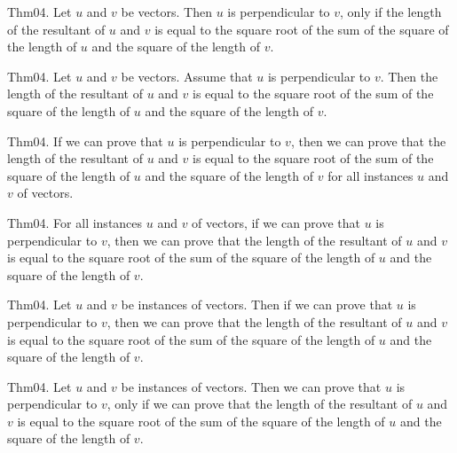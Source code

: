 \documentclass{article}
\begin{document}
Thm04. Let $u$ and $v$ be vectors. Then $u$ is perpendicular to $v$, only if the length of the resultant of $u$ and $v$ is equal to the square root of the sum of the square of the length of $u$ and the square of the length of $v$.

Thm04. Let $u$ and $v$ be vectors. Assume that $u$ is perpendicular to $v$. Then the length of the resultant of $u$ and $v$ is equal to the square root of the sum of the square of the length of $u$ and the square of the length of $v$.

Thm04. If we can prove that $u$ is perpendicular to $v$, then we can prove that the length of the resultant of $u$ and $v$ is equal to the square root of the sum of the square of the length of $u$ and the square of the length of $v$ for all instances $u$ and $v$ of vectors.

Thm04. For all instances $u$ and $v$ of vectors, if we can prove that $u$ is perpendicular to $v$, then we can prove that the length of the resultant of $u$ and $v$ is equal to the square root of the sum of the square of the length of $u$ and the square of the length of $v$.

Thm04. Let $u$ and $v$ be instances of vectors. Then if we can prove that $u$ is perpendicular to $v$, then we can prove that the length of the resultant of $u$ and $v$ is equal to the square root of the sum of the square of the length of $u$ and the square of the length of $v$.

Thm04. Let $u$ and $v$ be instances of vectors. Then we can prove that $u$ is perpendicular to $v$, only if we can prove that the length of the resultant of $u$ and $v$ is equal to the square root of the sum of the square of the length of $u$ and the square of the length of $v$.
\end{document}

